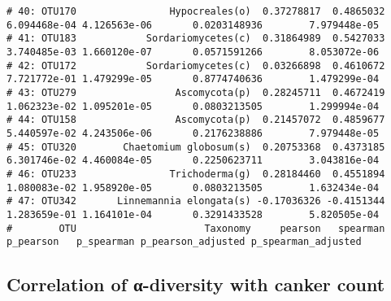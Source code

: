 \documentclass[
]{article}
\begin{document}
\begin{verbatim}
# 40: OTU170                Hypocreales(o)  0.37278817  0.4865032 6.094468e-04 4.126563e-06       0.0203148936        7.979448e-05
# 41: OTU183            Sordariomycetes(c)  0.31864989  0.5427033 3.740485e-03 1.660120e-07       0.0571591266        8.053072e-06
# 42: OTU172            Sordariomycetes(c)  0.03266898  0.4610672 7.721772e-01 1.479299e-05       0.8774740636        1.479299e-04
# 43: OTU279                 Ascomycota(p)  0.28245711  0.4672419 1.062323e-02 1.095201e-05       0.0803213505        1.299994e-04
# 44: OTU158                 Ascomycota(p)  0.21457072  0.4859677 5.440597e-02 4.243506e-06       0.2176238886        7.979448e-05
# 45: OTU320        Chaetomium globosum(s)  0.20753368  0.4373185 6.301746e-02 4.460084e-05       0.2250623711        3.043816e-04
# 46: OTU233                Trichoderma(g)  0.28184460  0.4551894 1.080083e-02 1.958920e-05       0.0803213505        1.632434e-04
# 47: OTU342       Linnemannia elongata(s) -0.17036326 -0.4151344 1.283659e-01 1.164101e-04       0.3291433528        5.820505e-04
#        OTU                      Taxonomy     pearson   spearman    p_pearson   p_spearman p_pearson_adjusted p_spearman_adjusted
\end{verbatim}

\hypertarget{correlation-of-ux3b1-diversity-with-canker-count}{%
\subsection{Correlation of α-diversity with canker
count}\label{correlation-of-ux3b1-diversity-with-canker-count}}
\end{document}

